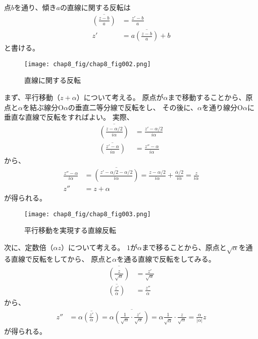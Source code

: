 点$b$を通り、傾き$a$の直線に関する反転は
\begin{align*}
    \overline{\left(\frac{z-b}{a}\right)}
    &=\frac{z'-b}{a}\\
    z'&=a\overline{\left(\frac{z-b}{a}\right)}+b
\end{align*}
と書ける。
\begin{figure}[h]
    \centering
    \texttt{[image: chap8\_fig/chap8\_fig002.png]}
    \caption{直線に関する反転}
    \label{fig:chap8_line}
\end{figure}

\newpage
まず、平行移動（$z+\alpha$）について考える。
原点が$\alpha$まで移動することから、原点と$\alpha$を結ぶ線分$\mathrm{O}\alpha$の垂直二等分線で反転をし、
その後に、$\alpha$を通り線分$\mathrm{O}\alpha$に垂直な直線で反転をすればよい。
実際、
\begin{align*}
    \overline{\left(\frac{z-\alpha/2}{i\alpha}\right)}
    &=\frac{z'-\alpha/2}{i\alpha}\\
    \overline{\left(\frac{z'-\alpha}{i\alpha}\right)}
    &=\frac{z''-\alpha}{i\alpha}
\end{align*}
から、
\begin{align*}
    \frac{z''-\alpha}{i\alpha}
    &=\overline{\left(\frac{z'-\alpha/2-\alpha/2}{i\alpha}\right)}
    =\frac{z-\alpha/2}{i\alpha}+\frac{\overline{\alpha}/2}{i\overline{\alpha}}
    =\frac{z}{i\alpha}\\
    z''&=z+\alpha
\end{align*}
が得られる。
\begin{figure}[h]
    \centering
    \texttt{[image: chap8\_fig/chap8\_fig003.png]}
    \caption{平行移動を実現する直線反転}
    \label{fig:chap8_parallel}
\end{figure}

\newpage
次に、定数倍（$\alpha z$）について考える。
$1$が$\alpha$まで移ることから、原点と$\sqrt{\alpha}$を通る直線で反転をしてから、
原点と$\alpha$を通る直線で反転をしてみる。
\begin{align*}
    \overline{\left(\frac{z}{\sqrt{\alpha}}\right)}
    &=\frac{z'}{\sqrt{\alpha}}\\
    \overline{\left(\frac{z'}{\alpha}\right)}
    &=\frac{z''}{\alpha}
\end{align*}
から、
\begin{align*}
    z''&=\alpha\overline{\left(\frac{z'}{\alpha}\right)}
    =\alpha\overline{\left(\frac{1}{\sqrt{\alpha}}\cdot\frac{z'}{\sqrt{\alpha}}\right)}
    =\alpha\frac{1}{\overline{\sqrt{\alpha}}}\cdot\frac{z}{\sqrt{\alpha}}
    =\frac{\alpha}{|\alpha|}z
\end{align*}
が得られる。

